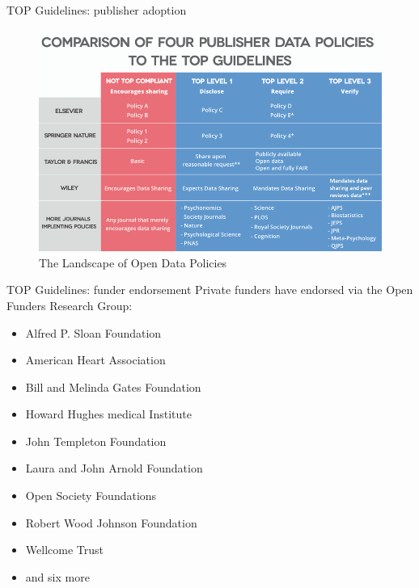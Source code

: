\documentclass[aspectratio=169, 11pt]{beamer} %
\begin{document}
\begin{frame}{TOP Guidelines: publisher adoption}
  \begin{figure}[H]
    \centering
        \includegraphics[height=.7\textheight]{figures/TOP-landscape.png}
        \caption{The Landscape of Open Data Policies \cite{Mellor2018-bf}}
        \label{fig:figure2}
  \end{figure}
\end{frame}

\begin{frame}{TOP Guidelines: funder endorsement}
  Private funders have endorsed via the Open Funders Research Group:
    \begin{itemize}[label=\textbullet]
        \item Alfred P. Sloan Foundation
        \item American Heart Association
        \item Bill and Melinda Gates Foundation
        \item Howard Hughes medical Institute
        \item John Templeton Foundation
        \item Laura and John Arnold Foundation
        \item Open Society Foundations
        \item Robert Wood Johnson Foundation
        \item Wellcome Trust
        \item and six more \cite{Ofrg2019-pq}
    \end{itemize}
\end{frame}
\end{document}
